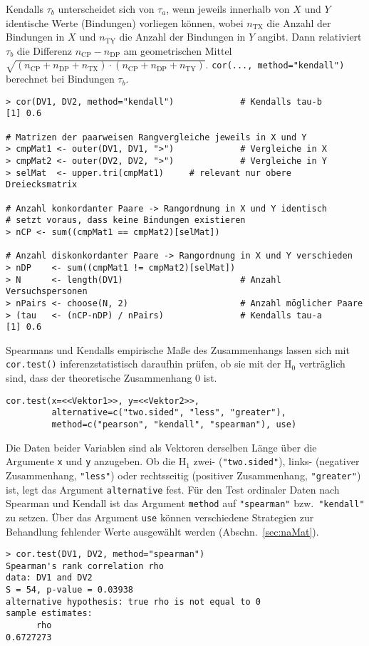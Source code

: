 Kendalls $\tau_{b}$ unterscheidet sich von $\tau_{a}$, wenn jeweils innerhalb von $X$ und $Y$ identische Werte (Bindungen) vorliegen können, wobei $n_{\text{TX}}$ die Anzahl der Bindungen in $X$ und $n_{\text{TY}}$ die Anzahl der Bindungen in $Y$ angibt. Dann relativiert $\tau_{b}$ die Differenz $n_{\text{CP}} - n_{\text{DP}}$ am geometrischen Mittel $\sqrt{(n_{\text{CP}} + n_{\text{DP}} + n_{\text{TX}}) \cdot (n_{\text{CP}} + n_{\text{DP}} + n_{\text{TY}})}$. \lstinline!cor(..., method="kendall")! berechnet bei Bindungen $\tau_{b}$.
\begin{lstlisting}
> cor(DV1, DV2, method="kendall")             # Kendalls tau-b
[1] 0.6

# Matrizen der paarweisen Rangvergleiche jeweils in X und Y
> cmpMat1 <- outer(DV1, DV1, ">")             # Vergleiche in X
> cmpMat2 <- outer(DV2, DV2, ">")             # Vergleiche in Y
> selMat  <- upper.tri(cmpMat1)     # relevant nur obere Dreiecksmatrix

# Anzahl konkordanter Paare -> Rangordnung in X und Y identisch
# setzt voraus, dass keine Bindungen existieren
> nCP <- sum((cmpMat1 == cmpMat2)[selMat])

# Anzahl diskonkordanter Paare -> Rangordnung in X und Y verschieden
> nDP    <- sum((cmpMat1 != cmpMat2)[selMat])
> N      <- length(DV1)                       # Anzahl Versuchspersonen
> nPairs <- choose(N, 2)                      # Anzahl möglicher Paare
> (tau   <- (nCP-nDP) / nPairs)               # Kendalls tau-a
[1] 0.6
\end{lstlisting}

Spearmans und Kendalls empirische Maße des Zusammenhangs lassen sich mit \lstinline!cor.test()! inferenzstatistisch daraufhin prüfen, ob sie mit der $\text{H}_{0}$ verträglich sind, dass der theoretische Zusammenhang $0$ ist.
\begin{lstlisting}
cor.test(x=<<Vektor1>>, y=<<Vektor2>>, 
         alternative=c("two.sided", "less", "greater"),
         method=c("pearson", "kendall", "spearman"), use)
\end{lstlisting}

Die Daten beider Variablen sind als Vektoren derselben Länge über die Argumente \lstinline!x! und \lstinline!y! anzugeben. Ob die $\text{H}_{1}$ zwei- (\lstinline!"two.sided"!), links- (negativer Zusammenhang, \lstinline!"less"!) oder rechtsseitig (positiver Zusammenhang, \lstinline!"greater"!) ist, legt das Argument \lstinline!alternative! fest. Für den Test ordinaler Daten nach Spearman und Kendall ist das Argument \lstinline!method! auf \lstinline!"spearman"! bzw.\ \lstinline!"kendall"! zu setzen. Über das Argument \lstinline!use! können verschiedene Strategien zur Behandlung fehlender Werte ausgewählt werden (Abschn.\ \ref{sec:naMat}).
\begin{lstlisting}
> cor.test(DV1, DV2, method="spearman")
Spearman's rank correlation rho
data: DV1 and DV2
S = 54, p-value = 0.03938
alternative hypothesis: true rho is not equal to 0
sample estimates:
      rho
0.6727273
\end{lstlisting}


